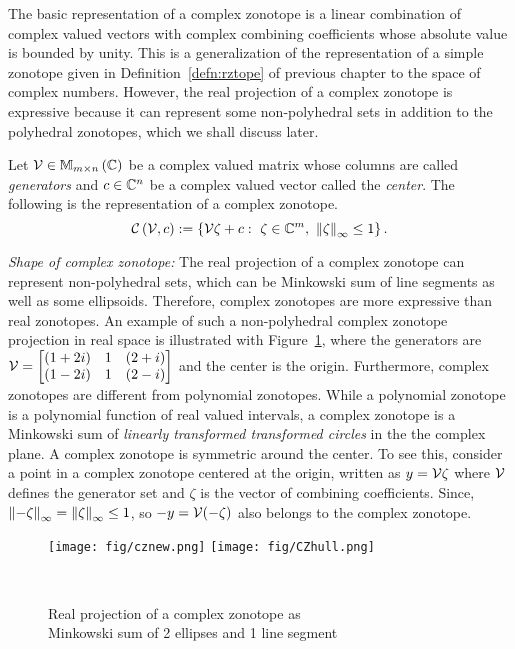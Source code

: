 The basic representation of a complex zonotope is a linear combination
of complex valued vectors with complex combining coefficients whose
absolute value is bounded by unity.  This is a generalization of the
representation of a simple zonotope given in Definition~\ref{defn:rztope} of
previous chapter to the space of complex numbers.  However, the real
projection of a complex zonotope is expressive because it can
represent some non-polyhedral sets in addition to the polyhedral
zonotopes, which we shall discuss later.
%
\begin{definition}
Let $\mathcal{V}\in\mathbb{M}_{m\times n}\left(\mathbb{C}\right)$ be a complex valued matrix
whose columns are called {\it generators} and $c\in\mathbb{C}^n$ be a
complex valued vector called the {\it center}.  The following is the
representation of a
complex zonotope.
%
\begin{equation}
\mathit{\mathcal{C}}\left(\mathcal{V},c\right) := \left\{\mathcal{V}\zeta+c:~\zeta\in\mathbb{C}^m,~\left\|\zeta\right\|_{\infty}\leq 1\right\}.
\end{equation}
%
\end{definition}
%
{\it Shape of complex zonotope:} The real projection of a complex
zonotope can represent non-polyhedral sets, which can be Minkowski sum
of line segments as well as some ellipsoids.  Therefore, complex
zonotopes are more expressive than real zonotopes.  An example of such
a non-polyhedral complex zonotope projection in real space is
illustrated with Figure~\ref{fig:cz}, where the generators are
$\mathcal{V}=\left[\begin{matrix}(1+2i) & 1 & (2+i)\\(1-2i) & 1 &
(2-i)\end{matrix}\right]                   $ and the center is the origin.  Furthermore,
complex zonotopes are different from polynomial zonotopes.  While a
polynomial zonotope is a polynomial function of real valued intervals,
a complex zonotope is a Minkowski sum of \emph{linearly transformed
transformed circles} in the the complex plane.  A complex zonotope is
symmetric around the center.  To see this, consider a point in a
complex zonotope centered at the origin, written as $y=\mathcal{V}\zeta$
where $\mathcal{V}$ defines the generator set and $\zeta$ is the vector of
combining coefficients.  Since, $\left\|-\zeta\right\|_{\infty}=\left\|\zeta\right\|_{\infty}\leq
1$, so $-y=\mathcal{V}(-\zeta)$ also belongs to the complex zonotope.
%
\begin{figure}
\centering
\captionsetup{justification=centering}
\texttt{[image: fig/cznew.png]}
\texttt{[image: fig/CZhull.png]}
\caption{Real projection of a complex zonotope as\\ Minkowski sum of 2 ellipses and 1 line segment }~\label{fig:cz}
\end{figure}
